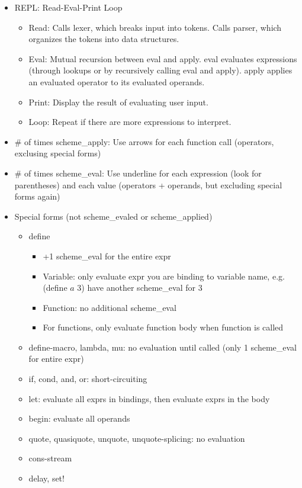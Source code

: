 \documentclass{article}
\begin{document}
\begin{itemize}
	\item REPL: Read-Eval-Print Loop
	\begin{itemize}
		\item Read: Calls lexer, which breaks input into tokens. Calls parser, which organizes the tokens into data structures.
		\item Eval: Mutual recursion between eval and apply. eval evaluates expressions (through lookups or by recursively calling eval and apply). apply applies an evaluated operator to its evaluated operands.
		\item Print: Display the result of evaluating user input.
		\item Loop: Repeat if there are more expressions to interpret.
	\end{itemize}
	\item \# of times scheme\_apply: Use arrows for each function call (operators, exclusing special forms)
	\item \# of times scheme\_eval: Use underline for each expression (look for parentheses) and each value (operators + operands, but excluding special forms again)
	
	\item Special forms (not scheme\_evaled or scheme\_applied)
	\begin{itemize}
		\item define
		\begin{itemize}
			\item +1 scheme\_eval for the entire expr
			\item Variable: only evaluate expr you are binding to variable name, e.g. (define $a$ 3) have another scheme\_eval for 3
			\item Function: no additional scheme\_eval
			\item For functions, only evaluate function body when function is called
		\end{itemize}
		\item define-macro, lambda, mu: no evaluation until called (only 1 scheme\_eval for entire expr)
		\item if, cond, and, or: short-circuiting
		\item let: evaluate all exprs in bindings, then evaluate exprs in the body
		\item begin: evaluate all operands
		\item quote, quasiquote, unquote, unquote-splicing: no evaluation
		\item cons-stream
		\item delay, set!
	\end{itemize}


\end{itemize}
\end{document}
